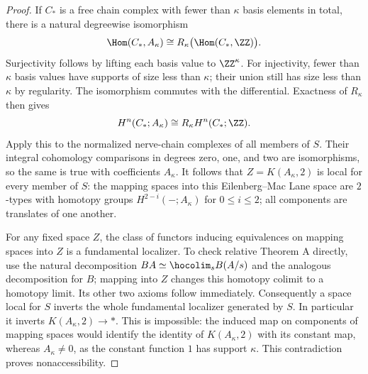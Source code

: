 \begin{proof}
If $C_*$ is a free chain complex with fewer than $\kappa$ basis elements in total, there is a natural degreewise isomorphism
\[
 \Hom(C_*,A_\kappa)
 \cong R_\kappa\bigl(\Hom(C_*,\ZZ)\bigr).
\]
Surjectivity follows by lifting each basis value to $\ZZ^\kappa$. For injectivity, fewer than $\kappa$ basis values have supports of size less than $\kappa$; their union still has size less than $\kappa$ by regularity. The isomorphism commutes with the differential. Exactness of $R_\kappa$ then gives
\[
 H^n(C_*;A_\kappa)\cong R_\kappa H^n(C_*;\ZZ).
\]
Apply this to the normalized nerve-chain complexes of all members of $S$. Their integral cohomology comparisons in degrees zero, one, and two are isomorphisms, so the same is true with coefficients $A_\kappa$. It follows that $Z=K(A_\kappa,2)$ is local for every member of $S$: the mapping spaces into this Eilenberg--Mac Lane space are $2$-types with homotopy groups $H^{2-i}(-;A_\kappa)$ for $0\leq i\leq2$; all components are translates of one another.

For any fixed space $Z$, the class of functors inducing equivalences on mapping spaces into $Z$ is a fundamental localizer. To check relative Theorem A directly, use the natural decomposition $BA\simeq\hocolim_sB(A/s)$ and the analogous decomposition for $B$; mapping into $Z$ changes this homotopy colimit to a homotopy limit. Its other two axioms follow immediately. Consequently a space local for $S$ inverts the whole fundamental localizer generated by $S$. In particular it inverts $K(A_\kappa,2)\to*$. This is impossible: the induced map on components of mapping spaces would identify the identity of $K(A_\kappa,2)$ with its constant map, whereas $A_\kappa\neq0$, as the constant function $1$ has support $\kappa$. This contradiction proves nonaccessibility.
\end{proof}

